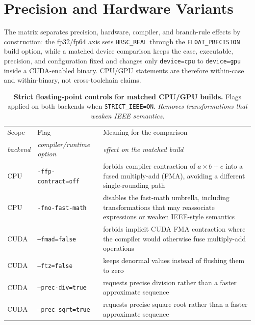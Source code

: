 \section{Precision and Hardware Variants}
The matrix separates precision, hardware, compiler, and branch-rule effects by
construction: the fp32/fp64 axis sets \texttt{HRSC\_REAL} through the
\texttt{FLOAT\_PRECISION} build option, while a matched device comparison keeps the
case, executable, precision, and configuration fixed and changes only
\texttt{device=cpu} to \texttt{device=gpu} inside a CUDA-enabled binary.
CPU/GPU statements are therefore within-case and within-binary, not
cross-toolchain claims.

\begin{table}[htbp]
\centering
\small
\begin{tabularx}{\textwidth}{@{}ll>{\raggedright\arraybackslash}X@{}}
\toprule
Scope & Flag & Meaning for the comparison \\
\itshape backend & \itshape compiler/runtime option & \itshape effect on the matched build \\
\midrule \addlinespace[2pt]
CPU & \texttt{-ffp-contract=off} & forbids compiler contraction of
\(a\times b+c\) into a fused multiply-add (FMA), avoiding a different
single-rounding path \\
CPU & \texttt{-fno-fast-math} & disables the fast-math umbrella, including
transformations that may reassociate expressions or weaken IEEE-style
semantics \\
CUDA & \texttt{--fmad=false} & forbids implicit CUDA FMA contraction where the
compiler would otherwise fuse multiply-add operations \\
CUDA & \texttt{--ftz=false} & keeps denormal values instead of flushing them
to zero \\
CUDA & \texttt{--prec-div=true} & requests precise division rather than a
faster approximate sequence \\
CUDA & \texttt{--prec-sqrt=true} & requests precise square root rather than a
faster approximate sequence \\
\bottomrule
\end{tabularx}
\caption[Strict floating-point controls for matched CPU/GPU builds]{\textbf{Strict floating-point controls for matched CPU/GPU builds.}
  Flags applied on both backends when \texttt{STRICT\_IEEE=ON}.
  \emph{Removes transformations that weaken IEEE semantics.}}
\label{tab:ch4-strict-flags}
\end{table}

